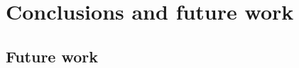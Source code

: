 \documentclass[a4paper, twoside]{report}
\begin{document}
\chapter{Conclusions and future work}
\section{Future work}
% 
% 



\end{document}
